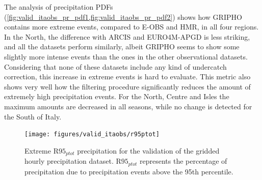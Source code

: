 The analysis of precipitation PDFs (\cref{fig:valid_itaobs_pr_pdf1,fig:valid_itaobs_pr_pdf2}) shows how GRIPHO contains more extreme events, compared to E-OBS and HMR, in all four regions. In the North, the difference with ARCIS and EURO4M-APGD is less striking, and all the datasets perform similarly, albeit GRIPHO seems to show some slightly more intense events than the ones in the other observational datasets.
Considering that none of these datasets include any kind of undercatch correction, this increase in extreme events is hard to evaluate.
This metric also shows very well how the filtering procedure significantly reduces the amount of extremely high precipitation events.
For the North, Centre and Isles the maximum amounts are decreased in all seasons, while no change is detected for the South of Italy.
\begin{figure}
    \centering
        \texttt{[image: figures/valid\_itaobs/r95ptot]}
    \decoRule
    \caption[GRIPHO validation: $\textrm{R95}_{ptot}$]{
        Extreme $\textrm{R95}_{ptot}$ precipitation for the validation of the gridded hourly precipitation dataset. $\textrm{R95}_{ptot}$ represents the percentage of precipitation due to precipitation events above the 95th percentile.
} \label{fig:valid_itaobs_pr_r95}
\end{figure}
\afterpage{\clearpage}
